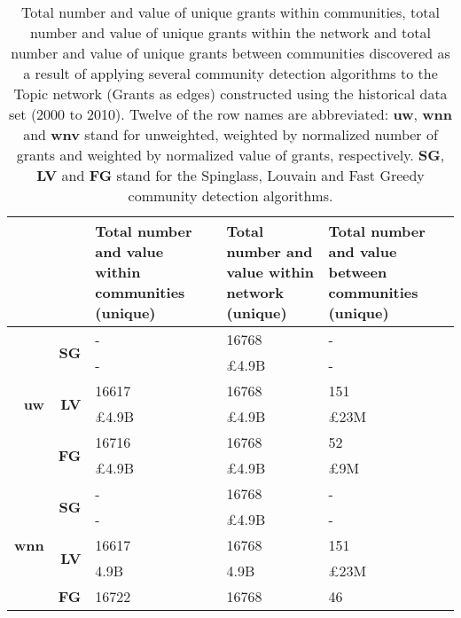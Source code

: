 \begin{table}[!htbp]
\centering
\caption[Total number and value of unique grants within communities, total number and value of unique grants within the network and total number and value of unique grants between communities discovered in the Topic network (Grants as edges) constructed using the historical data set (2000 to 2010)]{Total number and value of unique grants within communities, total number and value of unique grants within the network and total number and value of unique grants between communities discovered as a result of applying several community detection algorithms to the Topic network (Grants as edges) constructed using the historical data set (2000 to 2010). Twelve of the row names are abbreviated: \textbf{uw}, \textbf{wnn} and \textbf{wnv} stand for unweighted, weighted by normalized number of grants and weighted by normalized value of grants, respectively. \textbf{SG}, \textbf{LV} and \textbf{FG} stand for the Spinglass, Louvain and Fast Greedy community detection algorithms.}
\label{table:topic_a_past1_grants2_appendix}
\begin{tabular}{r|r|>{\raggedleft\arraybackslash}p{3.5cm}|>{\raggedleft\arraybackslash}p{3.2cm}|>{\raggedleft\arraybackslash}p{3.5cm}}
\multicolumn{2}{c|}{} & \textbf{Total number and value within communities (unique)} & \textbf{Total number and value within network (unique)} & \textbf{Total number and value between communities (unique)}\\
\hline
\multirow{6}{*}{\textbf{uw}}
& \multirow{2}{*}{\textbf{SG}}
& {-} & {16768} & {-}\\
& {} & {-} & {\pounds4.9B} & {-}\\
\cline{2-5}
& \multirow{2}{*}{\textbf{LV}}
& {16617} & {16768} & {151}\\
& {} & {\pounds4.9B} & {\pounds4.9B} & {\pounds23M}\\
\cline{2-5}
& \multirow{2}{*}{\textbf{FG}}
& {16716} & {16768} & {52}\\
& {} & {\pounds4.9B} & {\pounds4.9B} & {\pounds9M}\\
\hline
\multirow{6}{*}{\textbf{wnn}}
& \multirow{2}{*}{\textbf{SG}}
& {-} & {16768} & {-}\\
& {} & {-} & {\pounds4.9B} & {-}\\
\cline{2-5}
& \multirow{2}{*}{\textbf{LV}}
& {16617} & {16768} & {151}\\
& {} & {4.9B} & {4.9B} & {\pounds23M}\\
\cline{2-5}
& \multirow{2}{*}{\textbf{FG}}
& {16722} & {16768} & {46}\\

\end{tabular}
\end{table}
